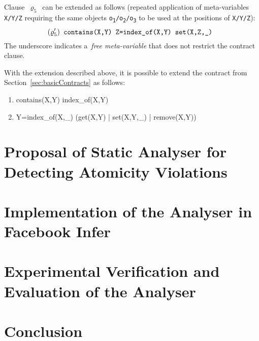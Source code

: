 Clause~$ \varrho_5 $~can be extended as follows (repeated application of
meta-variables \texttt{X/Y/Z} requiring the same objects
\texttt{o\textsubscript{1}/o\textsubscript{2}/o\textsubscript{3}} to be used
at the positions of \texttt{X/Y/Z}):
$$
    (\varrho^\prime_5) \text{\texttt{
        contains(X,Y) Z=index\_of(X,Y) set(X,Z,\_)
    }}
$$
The underscore indicates a~\emph{free meta-variable} that does not restrict
the contract clause.

With the extension described above, it is possible to extend the contract
from Section~\ref{sec:basicContracts} as follows:
\begin{enumerate}[label={$ (\varrho^\prime_{\arabic*}) $}]
    \tt

    \item contains(X,Y) index\_of(X,Y)
    \item Y=index\_of(X,\_) (get(X,Y) | set(X,Y,\_) | remove(X,Y))
\end{enumerate}



\chapter{Proposal of Static Analyser for Detecting Atomicity Violations}
\label{chap:proposal}



\chapter{Implementation of the Analyser in Facebook Infer}
\label{chap:implementation}



\chapter{Experimental Verification and Evaluation of the Analyser}
\label{chap:experiments}



\chapter{Conclusion}
\label{chap:conclusion}


